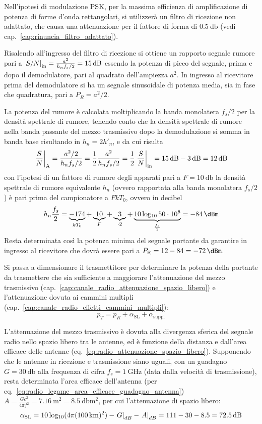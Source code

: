 Nell'ipotesi di modulazione \ac{PSK}, per la massima efficienza di amplificazione di potenza di forme d'onda rettangolari, si utilizzerà un filtro di ricezione non adattato, che causa una attenuazione per il fattore di forma di $\SI{0.5}{\decibel}$ (vedi cap.~\ref{cap:rinuncia_filtro_adattato}).

Risalendo all'ingresso del filtro di ricezione si ottiene un rapporto segnale rumore pari a $\restrict{S/N}{\text{in}}=\frac{a^2}{h_n f_s/2}=\SI{15}{\decibel}$ essendo la potenza di picco del segnale, prima e dopo il demodulatore, pari al quadrato dell'ampiezza $a^2$. In ingresso al ricevitore prima del demodulatore si ha un segnale sinusoidale di potenza media, sia in fase che quadratura, pari a $P_R=a^2/2$.

La potenza del rumore è calcolata moltiplicando la banda monolatera $f_s/2$ per la densità spettrale di rumore, tenendo conto che la densità spettrale di rumore nella banda passante del mezzo trasmissivo dopo la demodulazione si somma in banda base risultando in $h_n=2 h'_n$, e da cui risulta
\[\restrict{\frac{S}{N}}{\text{A}}=\frac{a^2/2}{h_n f_s/2}=\frac{1}{2}\frac{a^2}{h_n f_s/2}=\frac{1}{2}\restrict{\frac{S}{N}}{\text{in}}=\SI{15}{\decibel}-\SI{3}{\decibel}=\SI{12}{\decibel}\]
con l'ipotesi di un fattore di rumore degli apparati pari a $F=\SI{10}{\decibel}$ la densità spettrale di rumore equivalente $h_n$ (ovvero rapportata alla banda monolatera $f_s/2$) è pari prima del campionatore a $F k T_0$, ovvero in decibel
\[h_n \frac{f_s}{2}=\underbrace{-174}_{k T_0}+\underbrace{10}_{F}+\underbrace{3}_{\cdot 2}+\underbrace{10\Log{50\cdot 10^6}}_{\frac{f_s}{2}}=\SI{-84}{\dBm}\]
Resta determinata così la potenza minima del segnale portante da garantire in ingresso al ricevitore che dovrà essere pari a $P_\text{R}=12-84=\SI{-72}{\dBm}$.

Si passa a dimensionare il trasmettitore per determinare la potenza della portante da trasmettere che sia sufficiente a maggiorare l'attenuazione del mezzo trasmissivo (cap.~\ref{cap:canale_radio_attenuazione_spazio_libero}) e l'attenuazione dovuta ai cammini multipli (cap.~\ref{cap:canale_radio_effetti_cammini_multipli}):
\[p_T=p_R+\alpha_\text{SL}+\alpha_\text{suppl}\]

L'attenuazione del mezzo trasmissivo è dovuta alla divergenza sferica del segnale radio nello spazio libero tra le antenne, ed è funzione della distanza e dall'area efficace delle antenne (eq.~\ref{eq:radio_attenuazione_spazio_libero}). Supponendo che le antenne in ricezione e trasmissione siano uguali, con un guadagno $G=\SI{30}{\decibel}$ alla frequenza di cifra $f_s=\SI{1}{\giga\hertz}$ (data dalla velocità di trasmissione), resta determinata l'area efficace dell'antenna (per eq.~\ref{eq:radio_legame_area_efficace_guadagno_antenna}) $A=\frac{G c^2}{4\pi f^2}=\SI{7.16}{\meter\squared}=\SI{8.5}{\decibel\meter\squared}$, per cui l'attenuazione di spazio libero:
\[\alpha_\text{SL}=10\Log(4\pi(\SI{100}{\kilo\meter})^2)-\restrict{G}{dB}-\restrict{A}{dB}=111-30-8.5=\SI{72.5}{\decibel}\]

